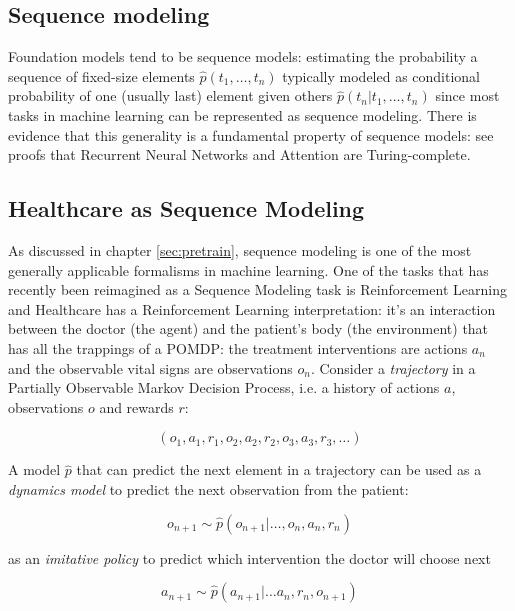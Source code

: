 \subsection{Sequence modeling}

Foundation models tend to be sequence models: estimating the probability a sequence of fixed-size elements $\hat{p}(t_1, \dots, t_n)$ typically modeled as conditional probability of one (usually last) element given others $\hat{p}(t_n | t_1, \dots, t_n)$ since most tasks in machine learning can be represented as sequence modeling. 
There is evidence that this generality is a fundamental property of sequence models: see proofs that Recurrent Neural Networks \cite{siegelmannComputationTuringLimit1995} and Attention \cite{perezAttentionTuringComplete} are Turing-complete.

\subsection{Healthcare as Sequence Modeling}
\label{sec:sequencemodel}

As discussed in chapter \ref{sec:pretrain}, sequence modeling is one of the most generally applicable formalisms in machine learning.
One of the tasks that has recently been reimagined as a Sequence Modeling task is Reinforcement Learning and Healthcare has a Reinforcement Learning interpretation: it's an interaction between the doctor (the agent) and the patient's body (the environment) that has all the trappings of a POMDP: the treatment interventions are actions $a_n$ and the observable vital signs are observations $o_n$.
Consider a \emph{trajectory} in a Partially Observable Markov Decision Process, i.e. a history of actions $a$, observations $o$ and rewards $r$:

\begin{equation}
    (o_1, a_1, r_1, o_2, a_2, r_2, o_3, a_3, r_3, \dots)
\end{equation}

A model $\hat{p}$ that can predict the next element in a trajectory can be used as a \emph{dynamics model} to predict the next observation from the patient:

\begin{equation}
    o_{n+1} \sim \hat{p}(o_{n+1} | \dots, o_n, a_n, r_n)
\end{equation}

as an \emph{imitative policy} to predict which intervention the doctor will choose next

\begin{equation}
    a_{n+1} \sim \hat{p}(a_{n+1} | \dots a_n, r_n, o_{n+1})
\end{equation}

